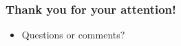 \documentclass{beamer}
\begin{document}
\begin{frame}
	\frametitle{Thank you for your attention!}
	\begin{itemize}
		\item Questions or comments?
	\end{itemize}
\end{frame}
\end{document}
